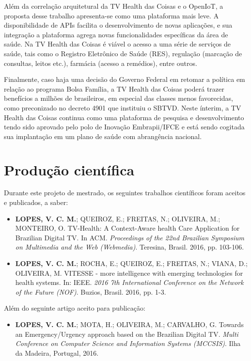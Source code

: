 Além da correlação arquitetural da TV Health das Coisas e o OpenIoT, a proposta
desse trabalho apresenta-se como uma plataforma mais leve. A disponibilidade de
APIs facilita o desenvolvimento de novas aplicações, e sua integração a plataforma
\nextsaude[] agrega novas funcionalidades específicas da área de saúde. Na TV
Health das Coisas é viável o acesso a uma série de serviços de saúde, tais como 
o Registro Eletrônico de Saúde (RES), regulação (marcação de consultas, leitos etc.),
farmácia (acesso a remédios), entre outros.

Finalmente, caso haja uma decisão do Governo Federal em retomar a política em
relação ao programa Bolsa Família, a TV Health das Coisas poderá trazer
benefícios a milhões de brasileiros, em especial das classes menos favorecidas,
como preconizado no decreto 4901 que instituiu o SBTVD. Neste ínterim, a TV
Health das Coisas continua como uma plataforma de pesquisa e desenvolvimento
tendo sido aprovado pelo polo de Inovação Embrapii/IFCE e está sendo cogitada
sua implantação em um plano de saúde com abrangência nacional.

\section{Produção científica}\label{sec:producao}  

Durante este projeto de mestrado, os seguintes trabalhos científicos foram
aceitos e publicados, a saber:

\begin{itemize}
  \item \textbf{LOPES, V. C. M.}; QUEIROZ, E.; FREITAS, N.; OLIVEIRA, M.; MONTEIRO, O. TV-Health:
  A Context-Aware health Care Application for Brazilian Digital TV. In ACM.
  \textit{Proceedings of the 22nd Brazilian Symposium on Multimedia and the Web (Webmedia)}. 
  Teresina, Brasil. 2016, pp. 103-106.

  \item \textbf{LOPES, V. C. M.}; ROCHA, E.; QUEIROZ, E.; FREITAS, N.; VIANA, D.; OLIVEIRA, M. VITESSE 
  - more intelligence with emerging technologies for health systems. In: IEEE. 
  \textit{2016 7th International Conference on the Network of the Future (NOF)}. Buzios, Brasil. 2016, pp. 1-3.
\end{itemize}

Além do seguinte artigo aceito para publicação:

\begin{itemize}
  \item \textbf{LOPES, V. C. M.}; MOTA, H.; OLIVEIRA, M.; CARVALHO, G. Towards an Emergency/Urgency
    approach based on the Brazilian Digital TV. \textit{Multi Conference on Computer Science 
    and Information Systems (MCCSIS)}. Ilha da Madeira, Portugal, 2016.
\end{itemize}


